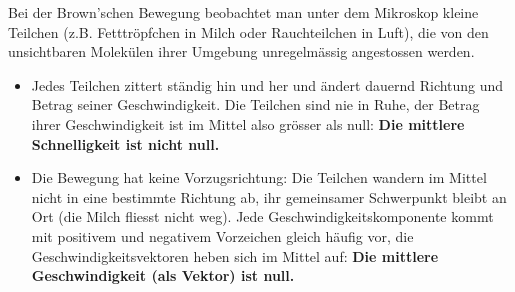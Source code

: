 Bei der Brown'schen Bewegung beobachtet man unter dem Mikroskop kleine Teilchen (z.B. Fetttröpfchen in Milch oder Rauchteilchen in Luft), die von den unsichtbaren Molekülen ihrer Umgebung unregelmässig angestossen werden.

\begin{itemize}
\item Jedes Teilchen zittert ständig hin und her und ändert dauernd Richtung und Betrag seiner Geschwindigkeit. Die Teilchen sind nie in Ruhe, der Betrag ihrer Geschwindigkeit ist im Mittel also grösser als null: \textbf{Die mittlere Schnelligkeit ist nicht null.}
\item Die Bewegung hat keine Vorzugsrichtung: Die Teilchen wandern im Mittel nicht in eine bestimmte Richtung ab, ihr gemeinsamer Schwerpunkt bleibt an Ort (die Milch fliesst nicht weg). Jede Geschwindigkeitskomponente kommt mit positivem und negativem Vorzeichen gleich häufig vor, die Geschwindigkeitsvektoren heben sich im Mittel auf: \textbf{Die mittlere Geschwindigkeit (als Vektor) ist null.}
\end{itemize}
